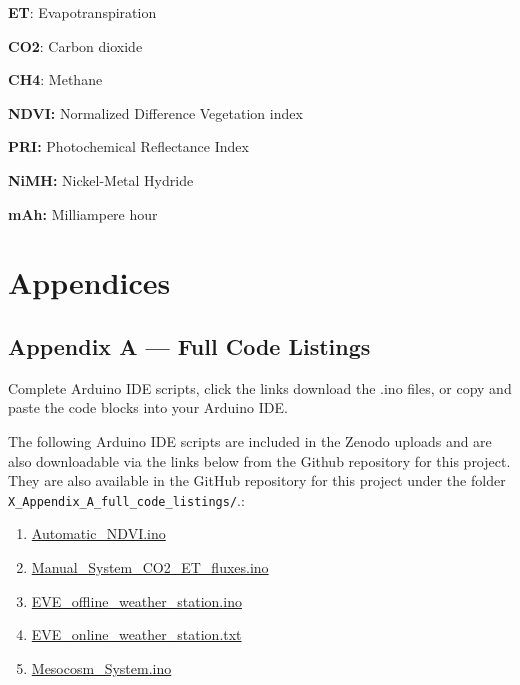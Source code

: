 \documentclass[
  11pt,
  letterpaper,
]{book}
\begin{document}
\textbf{ET}: Evapotranspiration

\textbf{CO2}: Carbon dioxide

\textbf{CH4}: Methane

\textbf{NDVI:} Normalized Difference Vegetation index

\textbf{PRI:} Photochemical Reflectance Index

\textbf{NiMH:} Nickel-Metal Hydride

\textbf{mAh:} Milliampere hour


\chapter{Appendices}\label{appendices}

\section{Appendix A --- Full Code Listings}\label{sec-appendix_A}

Complete Arduino IDE scripts, click the links download the .ino files,
or copy and paste the code blocks into your Arduino IDE.

The following Arduino IDE scripts are included in the Zenodo uploads and
are also downloadable via the links below from the Github repository for
this project. They are also available in the GitHub repository for this
project under the folder
\texttt{X\_Appendix\_A\_full\_code\_listings/}.:

\begin{enumerate}
\def\labelenumi{\arabic{enumi}.}
\item
  \href{https://github.com/zalf-lli/LCSfFE-handbook/blob/main/X_Appendix_A_full_code_listings/Automatic_NDVI/Automatic_NDVI.ino}{Automatic\_NDVI.ino}
\item
  \href{https://github.com/zalf-lli/LCSfFE-handbook/blob/main/X_Appendix_A_full_code_listings/Manual_System_CO2_ET_fluxes/Manual_System_CO2_ET_fluxes\%20.ino}{Manual\_System\_CO2\_ET\_fluxes.ino}
\item
  \href{https://github.com/zalf-lli/LCSfFE-handbook/blob/main/X_Appendix_A_full_code_listings/EVE_offline/EVE_offline_weather_station.ino}{EVE\_offline\_weather\_station.ino}
\item
  \href{https://github.com/zalf-lli/LCSfFE-handbook/blob/main/X_Appendix_A_full_code_listings/EVE_online/EVE_online_weather_station.txt}{EVE\_online\_weather\_station.txt}
\item
  \href{https://github.com/zalf-lli/LCSfFE-handbook/blob/main/X_Appendix_A_full_code_listings/Mesocosm_System.ino}{Mesocosm\_System.ino}
\end{enumerate}
\end{document}
